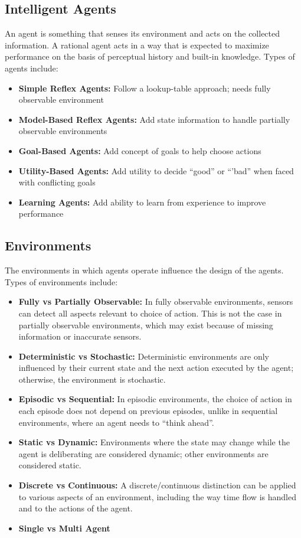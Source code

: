 \documentclass[12pt,titlepage]{article}
\begin{document}
    \subsection{Intelligent Agents}
      An agent is something that senses its environment and acts on the collected information. A rational agent acts in a way that is
      expected to maximize performance on the basis of perceptual history and built-in knowledge. Types of agents include:
      \begin{itemize}
        \item \textbf{Simple Reflex Agents:} Follow a lookup-table approach; needs fully observable environment
        \item \textbf{Model-Based Reflex Agents:} Add state information to handle partially observable environments
        \item \textbf{Goal-Based Agents:} Add concept of goals to help choose actions
        \item \textbf{Utility-Based Agents:} Add utility to decide ``good'' or ``'bad'' when faced with conflicting goals
        \item \textbf{Learning Agents:} Add ability to learn from experience to improve performance
      \end{itemize}

    \subsection{Environments}
      The environments in which agents operate influence the design of the agents. Types of environments include:
      \begin{itemize}
        \item \textbf{Fully vs Partially Observable:} In fully observable environments, sensors can detect all aspects
        relevant to choice of action. This is not the case in partially observable environments, which may exist because
        of missing information or inaccurate sensors.
        \item \textbf{Deterministic vs Stochastic:} Deterministic environments are only influenced by their current
        state and the next action executed by the agent; otherwise, the environment is stochastic.
        \item \textbf{Episodic vs Sequential:} In episodic environments, the choice of action in each episode does not
        depend on previous episodes, unlike in sequential environments, where an agent needs to ``think ahead''.
        \item \textbf{Static vs Dynamic:} Environments where the state may change while the agent is deliberating are
        considered dynamic; other environments are considered static.
        \item \textbf{Discrete vs Continuous:} A discrete/continuous distinction can be applied to various aspects of
        an environment, including the way time flow is handled and to the actions of the agent.
        \item \textbf{Single vs Multi Agent}
      \end{itemize}
\end{document}
